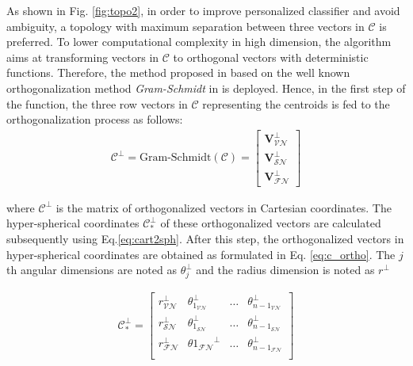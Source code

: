 As shown in Fig. \ref{fig:topo2}, in order to improve personalized classifier and avoid ambiguity, a topology with maximum separation between three vectors in $\mathcal{C}$ is preferred. To lower computational complexity in high dimension, the algorithm aims at transforming vectors in $\mathcal{C}$ to orthogonal vectors with deterministic functions. Therefore, the method proposed in \cite{Gram-schmidth2} based on the well known orthogonalization method \textit{Gram-Schmidt} in \cite{Gram-schmidth1} is deployed. Hence, in the first step of the function, the three row vectors in $\mathcal{C}$ representing the centroids is fed to the orthogonalization process as follows:
\begin{align}
\mathcal{C}^{\perp}= \text{Gram-Schmidt}(\mathcal{C})
=
\begin{bmatrix}
\mathbf{V}_{\mathcal{VN}}^{\perp} \\
\mathbf{V}_{\mathcal{SN}}^{\perp} \\
\mathbf{V}_{\mathcal{FN}}^{\perp}
\end{bmatrix}
\end{align}

where $\mathcal{C}^{\perp}$ is the matrix of orthogonalized vectors in Cartesian coordinates. The hyper-spherical coordinates $\mathcal{C}^{\perp}_{*}$ of these orthogonalized vectors are calculated subsequently using Eq.\ref{eq:cart2sph}. After this step, the orthogonalized vectors in hyper-spherical coordinates are obtained as formulated in Eq. \ref{eq:c_ortho}. The $j$th angular dimensions are noted as  $\theta_{j}^{\perp}$ and the radius dimension is noted as $r^{\perp}$%

\begin{align}
\label{eq:c_ortho}
\mathcal{C}^{\perp}_{*} =
\begin{bmatrix}
    r_{\mathcal{VN}}^{\perp} & \theta_{1_{\mathcal{VN}}}^{\perp} & \dots  & \theta_{{n-1}_{\mathcal{VN}}}^{\perp} \\
    r_{\mathcal{SN}}^{\perp} & \theta_{1_{\mathcal{SN}}}^{\perp} & \dots  & \theta_{{n-1}_{\mathcal{SN}}}^{\perp} \\
	r_{\mathcal{FN}}^{\perp} & \theta{1_{\mathcal{FN}}}^{\perp} & \dots  & \theta_{{n-1}_{\mathcal{FN}}}^{\perp} \\
\end{bmatrix}
\end{align}


